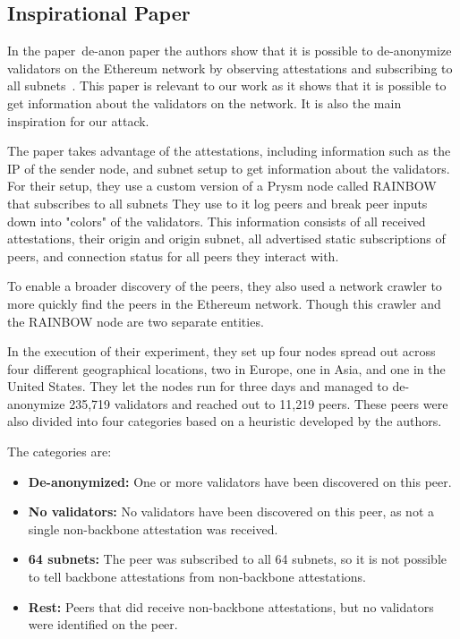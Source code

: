 \subsection{Inspirational Paper}\label{subsec:inspirational-papers}

In the paper~\gls{de-anon paper} the authors show that it is possible to de-anonymize validators on the Ethereum network by observing attestations and subscribing to all subnets~\cite{heimbach2024deanonymizingethereumvalidatorsp2p}.
This paper is relevant to our work as it shows that it is possible to get information about the validators on the network.
It is also the main inspiration for our attack.

The paper takes advantage of the attestations, including information such as the IP of the sender node, and subnet setup to get information about the validators.
For their setup, they use a custom version of a Prysm node called RAINBOW that subscribes to all subnets
They use to it log peers and break peer inputs down into "colors" of the validators.
This information consists of all received attestations, their origin and origin subnet, all advertised static subscriptions of peers, and connection status for all peers they interact with.

To enable a broader discovery of the peers, they also used a network crawler to more quickly find the peers in the Ethereum network.
Though this crawler and the RAINBOW node are two separate entities.

In the execution of their experiment, they set up four nodes spread out across four different geographical locations, two in Europe, one in Asia, and one in the United States.
They let the nodes run for three days and managed to de-anonymize 235,719 validators and reached out to 11,219 peers.
These peers were also divided into four categories based on a heuristic developed by the authors.

The categories are:
\begin{itemize}
    \item \textbf{De-anonymized:} One or more validators have been discovered on this peer.
    \item \textbf{No validators:} No validators have been discovered on this peer, as not a single non-backbone attestation was received.
    \item \textbf{64 subnets:} The peer was subscribed to all 64 subnets, so it is not possible to tell backbone attestations from non-backbone attestations.
    \item \textbf{Rest:} Peers that did receive non-backbone attestations, but no validators were identified on the peer.
\end{itemize}

